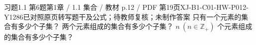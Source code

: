 \par\noindent\begin{minipage}{\linewidth}
\begin{bankitem}{习题1.1 第6题}{第1章 / 1.1 集合 / 教材 p.12 / PDF 第19页}{XJ-B1-C01-HW-P012-Y1286}{已对照原页转写题干及公式；待教师复核；未制作答案}
只有一个元素的集合有多少个子集？
两个元素组成的集合有多少个子集？
$n\ (n\in\mathbb Z_+)$ 个元素组成的集合有多少个子集？
\end{bankitem}
\end{minipage}\par\medskip
